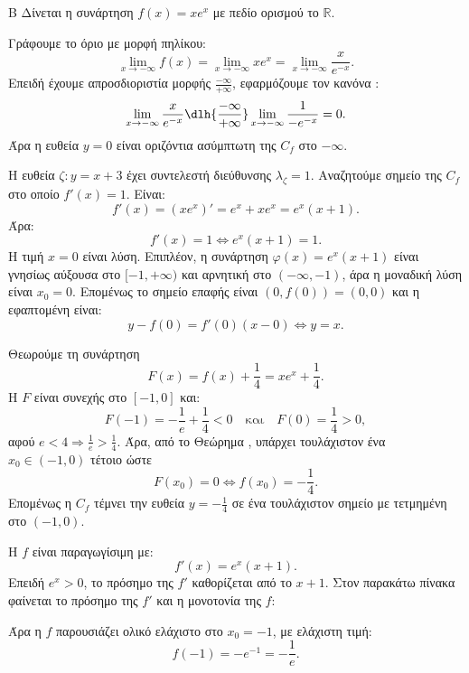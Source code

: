 \begin{thema}{Β}
Δίνεται η συνάρτηση $f(x) = x e^x$ με πεδίο ορισμού το $\mathbb{R}$.
\begin{erwthma}
\item Γράφουμε το όριο με μορφή πηλίκου:
\[ \lim_{x\to-\infty} f(x) = \lim_{x\to-\infty} x e^x = \lim_{x\to-\infty} \frac{x}{e^{-x}}. \]
Επειδή έχουμε απροσδιοριστία μορφής $\frac{-\infty}{+\infty}$, εφαρμόζουμε τον κανόνα :
\[ \lim_{x\to-\infty} \frac{x}{e^{-x}} \dlh{\frac{-\infty}{+\infty}} \lim_{x\to-\infty} \frac{1}{-e^{-x}} = 0. \]
Άρα η ευθεία $y=0$ είναι οριζόντια ασύμπτωτη της $C_f$ στο $-\infty$.

\item Η ευθεία $\zeta: y=x+3$ έχει συντελεστή διεύθυνσης $\lambda_\zeta=1$.
Αναζητούμε σημείο της $C_f$ στο οποίο $f'(x)=1$.
Είναι:
\[ f'(x)=(xe^x)'=e^x+xe^x=e^x(x+1). \]
Άρα:
\[ f'(x)=1 \Leftrightarrow e^x(x+1)=1. \]
Η τιμή $x=0$ είναι λύση. Επιπλέον, η συνάρτηση $\varphi(x)=e^x(x+1)$ είναι γνησίως αύξουσα στο $[-1,+\infty)$ και αρνητική στο $(-\infty,-1)$, άρα η μοναδική λύση είναι $x_0=0$.
Επομένως το σημείο επαφής είναι $(0,f(0))=(0,0)$ και η εφαπτομένη είναι:
\[ y-f(0)=f'(0)(x-0) \Leftrightarrow y=x. \]

\item Θεωρούμε τη συνάρτηση
\[ F(x)=f(x)+\frac{1}{4}=xe^x+\frac{1}{4}. \]
Η $F$ είναι συνεχής στο $[-1,0]$ και:
\[ F(-1)=-\frac{1}{e}+\frac{1}{4}<0 \quad \text{και} \quad F(0)=\frac{1}{4}>0, \]
αφού $e<4 \Rightarrow \frac{1}{e}>\frac{1}{4}$.
Άρα, από το Θεώρημα , υπάρχει τουλάχιστον ένα $x_0\in(-1,0)$ τέτοιο ώστε
\[ F(x_0)=0 \Leftrightarrow f(x_0)=-\frac{1}{4}. \]
Επομένως η $C_f$ τέμνει την ευθεία $y=-\frac{1}{4}$ σε ένα τουλάχιστον σημείο με τετμημένη στο $(-1,0)$.

\item Η $f$ είναι παραγωγίσιμη με:
\[ f'(x)=e^x(x+1). \]
Επειδή $e^x>0$, το πρόσημο της $f'$ καθορίζεται από το $x+1$.
Στον παρακάτω πίνακα φαίνεται το πρόσημο της $f'$ και η μονοτονία της $f$:
\begin{center}
\end{center}
Άρα η $f$ παρουσιάζει ολικό ελάχιστο στο $x_0=-1$, με ελάχιστη τιμή:
\[ f(-1)=-e^{-1}=-\frac{1}{e}. \]
\end{erwthma}
\end{thema}

